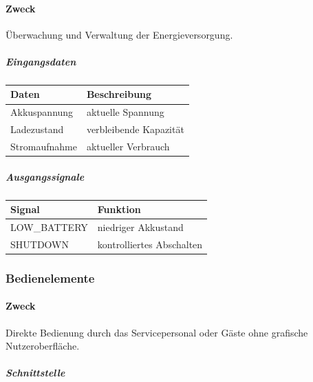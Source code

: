 \documentclass[
  a4paper,
  12pt,
  DIV=12,        %
  parskip=half,  %
  headings=small %
]{scrartcl}
\theoremstyle{definition}
\theoremstyle{definition}
\begin{document}
\paragraph{Zweck}\label{zweck-5}

Überwachung und Verwaltung der Energieversorgung.

\subparagraph{Eingangsdaten}\label{eingangsdaten}

\begin{longtable}[]{@{}ll@{}}
\toprule\noalign{}
Daten & Beschreibung \\
\midrule\noalign{}
\endhead
\bottomrule\noalign{}
\endlastfoot
Akkuspannung & aktuelle Spannung \\
Ladezustand & verbleibende Kapazität \\
Stromaufnahme & aktueller Verbrauch \\
\end{longtable}

\subparagraph{Ausgangssignale}\label{ausgangssignale}

\begin{longtable}[]{@{}ll@{}}
\toprule\noalign{}
Signal & Funktion \\
\midrule\noalign{}
\endhead
\bottomrule\noalign{}
\endlastfoot
LOW\_BATTERY & niedriger Akkustand \\
SHUTDOWN & kontrolliertes Abschalten \\
\end{longtable}

\subsubsection{Bedienelemente}\label{bedienelemente-1}

\paragraph{Zweck}\label{zweck-6}

Direkte Bedienung durch das Servicepersonal oder Gäste ohne grafische
Nutzeroberfläche.

\subparagraph{Schnittstelle}\label{schnittstelle-5}
\end{document}
